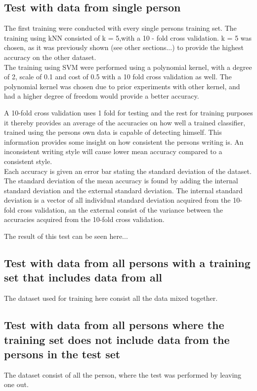 \subsection{Test with data from single person}
\label{sec::test_with_data_from_single_person}

The first training were conducted with every single persons training set. The 
training using kNN consisted of k = 5,with a 10 - fold cross validation. k = 5 
was chosen, as it was previously shown (see other sections...) to provide the highest accuracy on the other dataset. \\

The training using SVM were performed using a polynomial kernel, with a degree 
of 2, scale of 0.1   and cost of 0.5 with a 10 fold cross validation as well. 
The polynomial kernel was chosen due to prior experiments with other kernel, and 
had a higher degree of freedom would provide a better accuracy.\\ 

 
A
10-fold cross validation uses 1 fold for testing and the rest for training 
purposes it thereby provides an average of the accuracies on how well a trained 
classifier, trained using the persons own data is capable of detecting himself.  
This information provides some insight on how consistent the persons writing is. 
An inconsistent writing style will cause lower mean accuracy compared to a 
consistent style. \\

 Each accuracy is given an error bar stating the standard deviation of the 
dataset. The standard deviation of the mean accuracy is found by adding the 
internal standard deviation and the external standard deviation. The internal 
standard deviation is a vector of all individual standard deviation acquired 
from the 10-fold cross validation, an the external consist of the variance 
between the accuracies acquired  from the 10-fold cross validation. 
 
 The result of this test can be seen here...
 

\subsection{Test with data from all persons with a training set that includes 
data from all}

The dataset used for training here consist all the data mixed together. 


\subsection{Test with data from all persons where the training set does not 
include data from 
the persons in the test set}

The dataset consist of all the person, where the test was performed by leaving one out.





